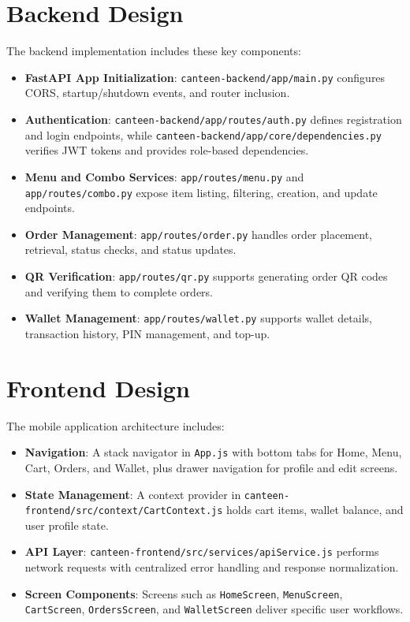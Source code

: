 \documentclass[12pt,a4paper]{report}
\begin{document}
\section{Backend Design}
The backend implementation includes these key components:
\begin{itemize}
  \item \textbf{FastAPI App Initialization}: \texttt{canteen-backend/app/main.py} configures CORS, startup/shutdown events, and router inclusion.
  \item \textbf{Authentication}: \texttt{canteen-backend/app/routes/auth.py} defines registration and login endpoints, while \texttt{canteen-backend/app/core/dependencies.py} verifies JWT tokens and provides role-based dependencies.
  \item \textbf{Menu and Combo Services}: \texttt{app/routes/menu.py} and \texttt{app/routes/combo.py} expose item listing, filtering, creation, and update endpoints.
  \item \textbf{Order Management}: \texttt{app/routes/order.py} handles order placement, retrieval, status checks, and status updates.
  \item \textbf{QR Verification}: \texttt{app/routes/qr.py} supports generating order QR codes and verifying them to complete orders.
  \item \textbf{Wallet Management}: \texttt{app/routes/wallet.py} supports wallet details, transaction history, PIN management, and top-up.
\end{itemize}

\section{Frontend Design}
The mobile application architecture includes:
\begin{itemize}
  \item \textbf{Navigation}: A stack navigator in \texttt{App.js} with bottom tabs for Home, Menu, Cart, Orders, and Wallet, plus drawer navigation for profile and edit screens.
  \item \textbf{State Management}: A context provider in \texttt{canteen-frontend/src/context/CartContext.js} holds cart items, wallet balance, and user profile state.
  \item \textbf{API Layer}: \texttt{canteen-frontend/src/services/apiService.js} performs network requests with centralized error handling and response normalization.
  \item \textbf{Screen Components}: Screens such as \texttt{HomeScreen}, \texttt{MenuScreen}, \texttt{CartScreen}, \texttt{OrdersScreen}, and \texttt{WalletScreen} deliver specific user workflows.
\end{itemize}
\end{document}
